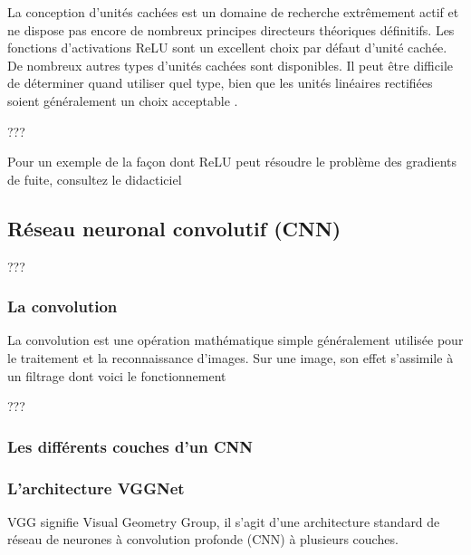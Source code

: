 	
	La conception d'unités cachées est un domaine de recherche extrêmement actif et ne dispose pas encore de nombreux principes directeurs théoriques définitifs.
	Les fonctions d'activations ReLU sont un excellent choix par défaut d'unité cachée. De nombreux autres types d'unités cachées sont disponibles. Il peut être diﬃcile de déterminer quand utiliser quel type, bien que les unités linéaires rectiﬁées soient généralement un choix acceptable \cite{goodfellow2016deep}.
	
	???
	
	Pour un exemple de la façon dont ReLU peut résoudre le problème des gradients de fuite, consultez le didacticiel 


	
	
	\subsection{Réseau neuronal convolutif (CNN)}
	???
	\cite{shin2016deep} 
	
	\subsubsection{La convolution}
	
	La convolution est une opération mathématique simple généralement utilisée pour le traitement et la reconnaissance d’images. Sur une image, son effet s’assimile à un filtrage dont voici le fonctionnement
	
	???
	\lipsum[1]
	\subsubsection{Les différents couches d'un CNN}
	\lipsum[1]
	\subsubsection{L'architecture VGGNet}
	
	VGG signifie Visual Geometry Group, il s'agit d'une architecture standard de réseau de neurones à convolution profonde (CNN) à plusieurs couches. %
	
